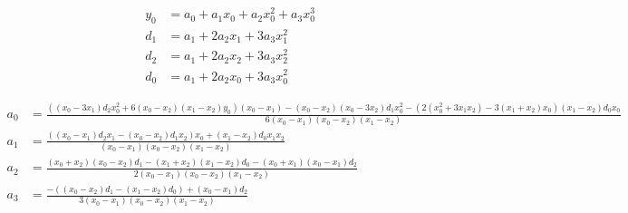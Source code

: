 \begin{align}
  y_0 & = a_0+a_1 x_0+a_2 x_0^{2}+a_3 x_0^{3}  \\
   d_1 & = a_1+2 a_2 x_1+3 a_3 x_1^{2}  \\
   d_2 & = a_1+2 a_2  x_2+3 a_3 x_2^{2}  \\
   d_0 & = a_1+2 a_2 x_0+3 a_3 x_0^{2}  
\end{align}

 
\begin{align}
  a_0 & = \frac
{ \left(  \left( x_0 - 3 x_1 \right)  d_2 x_0^{2}+6  \left( x_0 - x_2 \right)    \left( x_1 - x_2 \right)  y_0 \right)   \left( x_0 - x_1 \right)  -  \left( x_0 - x_2 \right)    \left( x_0 - 3 x_2 \right)  d_1 x_0^{2} -  \left( 2  \left( x_0^{2}+3 x_1 x_2 \right)  - 3   \left( x_1+x_2 \right)  x_0 \right)   \left( x_1 - x_2 \right)  d_0 x_0}
{6   \left( x_0 - x_1 \right)   \left( x_0 - x_2 \right)   \left( x_1 - x_2 \right) } \\
   a_1 & = \frac
{ \left(  \left( x_0 - x_1 \right)  d_2 x_1 -  \left( x_0 - x_2 \right)  d_1 x_2 \right)  x_0+  \left( x_1 - x_2 \right)  d_0 x_1 x_2}
{ \left( x_0 - x_1 \right)   \left( x_0 - x_2  \right)   \left( x_1 - x_2 \right) } \\
   a_2 & = \frac
{ \left( x_0+x_2 \right)   \left( x_0  - x_2 \right)  d_1 -  \left( x_1+x_2 \right)   \left( x_1 - x_2 \right)  d_0 -  \left( x_0+x_1  \right)   \left( x_0 - x_1 \right)  d_2}
{2  \left( x_0 - x_1 \right)   \left( x_0  - x_2 \right)   \left( x_1 - x_2 \right) } \\
   a_3 & = \frac
{ -  \left(  \left( x_0 - x_2  \right)  d_1 -  \left( x_1 - x_2 \right)  d_0 \right) + \left( x_0 - x_1 \right)  d_2}
{3  \left( x_0 - x_1 \right)   \left( x_0 - x_2 \right)   \left( x_1 - x_2 \right) } 
\end{align}
